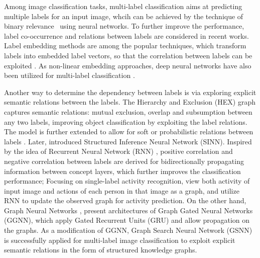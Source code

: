 \documentclass[10pt,twocolumn,letterpaper]{article}
\begin{document}
Among image classification tasks, multi-label classification  aims at predicting multiple labels for an input image, whcih can be achieved by the technique of binary relevance~\cite{Tsoumakas07multi-labelclassification:} using neural networks. To further improve the performance, label co-occurrence and relations between labels are considered in recent works. Label embedding methods are among the popular techniques, which transform labels into embedded label vectors, so that the correlation between labels can be exploited \cite{weston2011wsabie,doi:10.1162/NECO_a_00320,DBLP:journals/corr/GongJLTI13,lin2014multi,yeh2017learning}. As non-linear embedding approaches, deep neural networks have also been utilized for multi-label classification \cite{1683770,DBLP:journals/corr/NamKGF13,DBLP:journals/corr/GongJLTI13,DBLP:journals/corr/WeiXHNDZY14,Wang_2016_CVPR,yeh2017learning}.

Another way to determine the dependency between labels is via exploring explicit semantic relations between the labels. The Hierarchy and Exclusion (HEX) graph \cite{deng2014large} captures semantic relations: mutual exclusion, overlap and subsumption between any two labels, improving object classification by exploiting the label relations. The model is further extended to allow for soft or probabilistic relations between labels \cite{ding2015probabilistic}. Later, \cite{hu2016learning} introduced Structured Inference Neural Network (SINN). Inspired by the idea of Recurrent Neural Network (RNN) \cite{hochreiter1997long,schuster1997bidirectional}, positive correlation and negative correlation between labels are derived for bidirectionally propagating information between concept layers, which further improves the classification performance; {Focusing on single-label activity recognition, \cite{deng2016structure} view both activity of input image and actions of each person in that image as a graph, and utilize RNN to update the observed graph for activity prediction.} On the other hand, Graph Neural Networks \cite{scarselli2009graph}, \cite{DBLP:journals/corr/LiTBZ15} present architectures of Graph Gated Neural Networks (GGNN), which apply Gated Recurrent Units (GRU) \cite{04d503dffe9f4dcfbacf886d1dee56fb} and allow propagation on the graphs. As a modification of GGNN, Graph Search Neural Network (GSNN) \cite{Marino_2017_CVPR} is successfully applied for multi-label image classification to exploit explicit semantic relations in the form of structured knowledge graphs.
\end{document}
